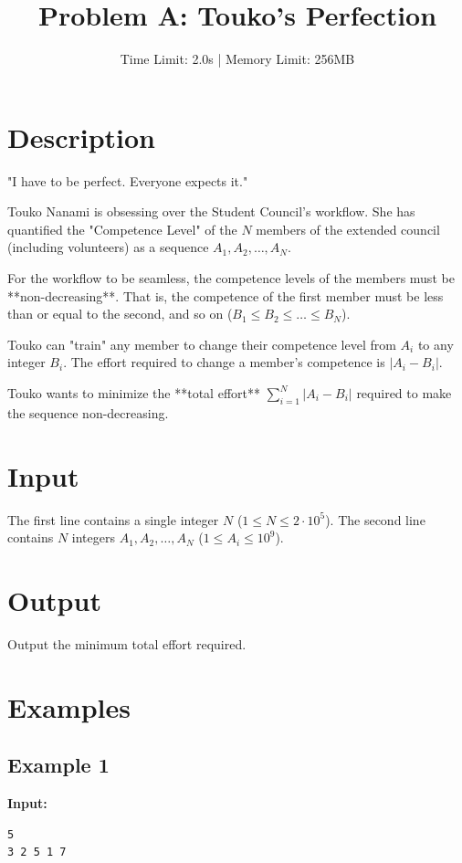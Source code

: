 \documentclass[11pt, letterpaper]{article}
\title{\textbf{Problem A: Touko's Perfection}}
\author{Time Limit: 2.0s | Memory Limit: 256MB}
\date{}
\begin{document}
\maketitle

\section*{Description}

"I have to be perfect. Everyone expects it."

Touko Nanami is obsessing over the Student Council's workflow. She has quantified the "Competence Level" of the $N$ members of the extended council (including volunteers) as a sequence $A_1, A_2, \dots, A_N$.

For the workflow to be seamless, the competence levels of the members must be **non-decreasing**. That is, the competence of the first member must be less than or equal to the second, and so on ($B_1 \le B_2 \le \dots \le B_N$).

Touko can "train" any member to change their competence level from $A_i$ to any integer $B_i$. The effort required to change a member's competence is $|A_i - B_i|$.

Touko wants to minimize the **total effort** $\sum_{i=1}^{N} |A_i - B_i|$ required to make the sequence non-decreasing.

\section*{Input}

The first line contains a single integer $N$ ($1 \le N \le 2 \cdot 10^5$).
The second line contains $N$ integers $A_1, A_2, \dots, A_N$ ($1 \le A_i \le 10^9$).

\section*{Output}

Output the minimum total effort required.

\section*{Examples}

\subsection*{Example 1}
\textbf{Input:}
\begin{verbatim}
5
3 2 5 1 7
\end{verbatim}
\end{document}
